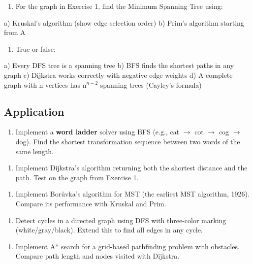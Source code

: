 \begin{enumerate}
\item For the graph in Exercise 1, find the Minimum Spanning Tree using:
\end{enumerate}
   a) Kruskal's algorithm (show edge selection order)
   b) Prim's algorithm starting from A

\begin{enumerate}
\item True or false:
\end{enumerate}
   a) Every DFS tree is a spanning tree
   b) BFS finds the shortest paths in any graph
   c) Dijkstra works correctly with negative edge weights
   d) A complete graph with n vertices has n$^{n-2}$ spanning trees (Cayley's formula)

\subsection{Application}

\begin{enumerate}
\item Implement a \textbf{word ladder} solver using BFS (e.g., cat $\to $ cot $\to $ cog $\to $ dog). Find the shortest transformation sequence between two words of the same length.
\end{enumerate}

\begin{enumerate}
\item Implement Dijkstra's algorithm returning both the shortest distance and the path. Test on the graph from Exercise 1.
\end{enumerate}

\begin{enumerate}
\item Implement Borůvka's algorithm for MST (the earliest MST algorithm, 1926). Compare its performance with Kruskal and Prim.
\end{enumerate}

\begin{enumerate}
\item Detect cycles in a directed graph using DFS with three-color marking (white/gray/black). Extend this to find all edges in any cycle.
\end{enumerate}

\begin{enumerate}
\item Implement A* search for a grid-based pathfinding problem with obstacles. Compare path length and nodes visited with Dijkstra.
\end{enumerate}

